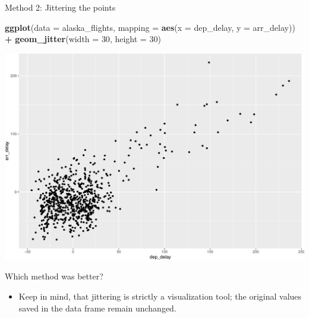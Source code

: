 \documentclass[
  ignorenonframetext,
]{beamer}
\newenvironment{Shaded}{\begin{snugshade}}{\end{snugshade}}
\newcommand{\AttributeTok}[1]{\textcolor[rgb]{0.13,0.29,0.53}{#1}}
\newcommand{\DecValTok}[1]{\textcolor[rgb]{0.00,0.00,0.81}{#1}}
\newcommand{\FunctionTok}[1]{\textcolor[rgb]{0.13,0.29,0.53}{\textbf{#1}}}
\newcommand{\NormalTok}[1]{#1}
\newcommand{\SpecialCharTok}[1]{\textcolor[rgb]{0.81,0.36,0.00}{\textbf{#1}}}
\providecommand{\tightlist}{%
  \setlength{\itemsep}{0pt}\setlength{\parskip}{0pt}}
\begin{document}
\begin{frame}[fragile]{Method 2: Jittering the points}
\protect\hypertarget{method-2-jittering-the-points-1}{}
\tiny

\begin{Shaded}
\begin{Highlighting}[]
\FunctionTok{ggplot}\NormalTok{(}\AttributeTok{data =}\NormalTok{ alaska\_flights, }\AttributeTok{mapping =} \FunctionTok{aes}\NormalTok{(}\AttributeTok{x =}\NormalTok{ dep\_delay, }\AttributeTok{y =}\NormalTok{ arr\_delay)) }\SpecialCharTok{+} 
  \FunctionTok{geom\_jitter}\NormalTok{(}\AttributeTok{width =} \DecValTok{30}\NormalTok{, }\AttributeTok{height =} \DecValTok{30}\NormalTok{)}
\end{Highlighting}
\end{Shaded}

\begin{center}\includegraphics[width=0.7\linewidth,height=0.5\textheight]{Week2_files/figure-beamer/unnamed-chunk-24-1} \end{center}
\normalsize

Which method was better?

\begin{itemize}
\tightlist
\item
  Keep in mind, that jittering is strictly a visualization tool; the
  original values saved in the data frame remain unchanged.
\end{itemize}
\end{frame}
\end{document}
